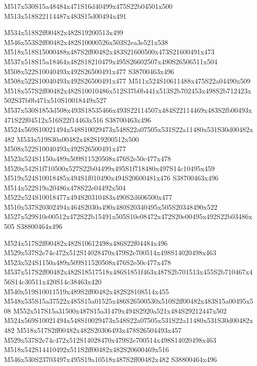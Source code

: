 \documentclass{article}
\begin{document}
\begin{multicols}{2}
\begin{center}
M517x530S15a48484x471S16d40499x475S22b04501x500 M513x518S22114487x483S15d00494x491 
\end{center}


M534x518S2ff00482x482S19200513x499 M546x553S2ff00482x482S10000526x503S2ea3e521x538 M518x518S15000488x487S2ff00482x483S21600500x473S21600491x473 M537x518S15a18464x482S18210479x495S26602507x490S26506511x504 M508x522S10040493x492S26500491x477 S38700463x496 M508x522S10040493x492S26500491x477 M511x524S10611488x475S22a04490x509 M518x557S2ff00482x482S10010486x512S37b0b441x513S2b702453x498S2b712423x502S37b0b471x510S10018449x527 M537x530S1853d508x493S18535466x493S22114507x484S22114469x483S2fb00493x471S22f04512x516S22f14463x516 S38700463x496 M524x569S10021494x548S10029473x548S22a07505x531S22a11480x531S30d00482x482 M533x519S30a00482x482S19200512x500 M508x522S10040493x492S26500491x477 M523x524S1150a489x509S11520508x476S2e50c477x478 M520x542S1f710500x527S22b04499x495S1f718480x497S14c10495x459 M519x524S10018485x494S1f010490x494S20600481x476 S38700463x496 M514x522S19a20486x478S22e04492x504 M522x524S10018477x494S20310483x490S2d606500x477 M510x537S20302494x464S2030a490x480S20340495x505S20348490x522 M527x529S10e00512x472S22b15491x505S10e08472x472S20e00495x492S22b03486x505 S38800464x496

M524x517S2ff00482x482S10612498x486S22f04484x496 M529x537S2e74c472x512S14028470x479S2e700514x498S14020498x463 M523x524S1150a489x509S11520508x476S2e50c477x478 M537x517S2ff00482x482S18517518x486S1851f463x487S2b701513x455S2b710467x456S14c30511x420S14c38463x420 M540x519S10011519x489S2ff00482x482S28108514x455 M548x535S15a37522x485S15a01525x486S26500530x510S2ff00482x483S15a00495x508 M552x517S15a31500x487S15a31479x494S2920a521x484S29212447x502 M524x569S10021494x548S10029473x548S22a07505x531S22a11480x531S30d00482x482 M518x517S2ff00482x482S20306493x478S26504493x457 M529x537S2e74c472x512S14028470x479S2e700514x498S14020498x463 M518x542S14410492x511S2ff00482x482S20600469x516 M546x530S23703497x495S19a10518x487S2ff00482x482 S38800464x496


\end{multicols}
\end{document}
